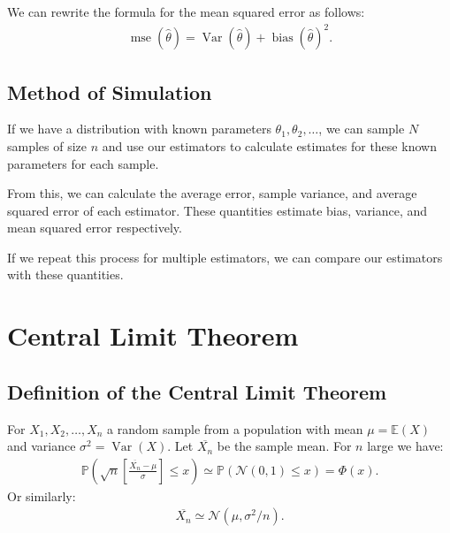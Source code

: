 \documentclass[a4paper, 12pt, twoside]{article}
\DeclareMathOperator{\Mse}{mse}
\DeclareMathOperator{\Bias}{bias}
\DeclareMathOperator{\Var}{Var}
\begin{document}
\vspace{\baselineskip}

We can rewrite the formula for the mean squared error as follows:
\begin{align*}
    \Mse(\hat\theta) = \Var(\hat\theta) + \Bias(\hat\theta)^2.
\end{align*}

\subsection{Method of Simulation}

If we have a distribution with known parameters $\theta_1, \theta_2,
    \ldots$, we can sample $N$ samples of size $n$ and use our estimators
to calculate estimates for these known parameters for each sample.

\vspace{\baselineskip}

From this, we can calculate the average error, sample variance, and
average squared error of each estimator. These quantities estimate
bias, variance, and mean squared error respectively.

\vspace{\baselineskip}

If we repeat this process for multiple estimators, we can compare
our estimators with these quantities.

\section{Central Limit Theorem}

\subsection{Definition of the Central Limit Theorem}

For $X_1, X_2, \ldots, X_n$ a random sample from a population with
mean $\mu = \mathbb{E}(X)$ and variance $\sigma^2 = \Var(X)$. Let
$\overline{X_n}$ be the sample mean. For $n$ large we have:
\begin{align*}
    \mathbb{P}\left( \sqrt{n}
    \left[\frac{\overline{X_n} - \mu}{\sigma}\right]
    \leq x \right) \simeq \mathbb{P}(\mathcal{N}(0, 1) \leq x) = \Phi(x).
\end{align*}
Or similarly:
\begin{align*}
    \overline{X_n} \simeq \mathcal{N}(\mu, \sigma^2/n).
\end{align*}
\end{document}
